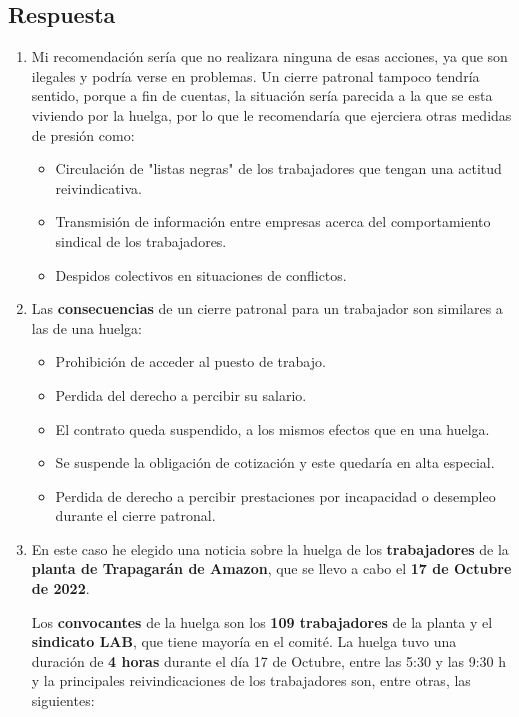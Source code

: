 \subsection{Respuesta}

\begin{enumerate}
    \item Mi recomendación sería que no realizara ninguna de esas acciones, ya que son ilegales y podría verse en problemas. Un cierre patronal tampoco tendría sentido, porque a fin de cuentas, la situación sería parecida a la que se esta viviendo por la huelga, por lo que le recomendaría que ejerciera otras medidas de presión como:

    \begin{itemize}
        \item Circulación de "listas negras" de los trabajadores que tengan una actitud reivindicativa.
        \item Transmisión de información entre empresas acerca del comportamiento sindical de los trabajadores.
        \item Despidos colectivos en situaciones de conflictos.
    \end{itemize}

    \item Las \textbf{consecuencias} de un cierre patronal para un trabajador son similares a las de una huelga:
    \begin{itemize}
        \item Prohibición de acceder al puesto de trabajo.
        \item Perdida del derecho a percibir su salario.
        \item El contrato queda suspendido, a los mismos efectos que en una huelga.
        \item Se suspende la obligación de cotización y este quedaría en alta especial.
        \item Perdida de derecho a percibir prestaciones por incapacidad o desempleo durante el cierre patronal.
    \end{itemize}

    \item En este caso he elegido una noticia sobre la huelga de los \textbf{trabajadores} de la \textbf{planta de Trapagarán de Amazon}, que se llevo a cabo el \textbf{17 de Octubre de 2022}.

    Los \textbf{convocantes} de la huelga son los \textbf{109 trabajadores} de la planta y el \textbf{sindicato LAB}, que tiene mayoría en el comité. La huelga tuvo una duración de \textbf{4 horas} durante el día 17 de Octubre, entre las 5:30 y las 9:30 h y la principales reivindicaciones de los trabajadores son, entre otras, las siguientes:


\end{enumerate}
